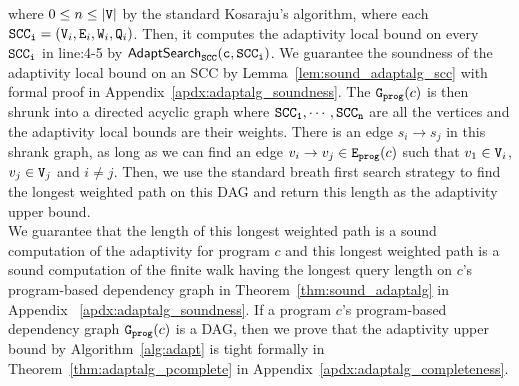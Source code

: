    where $0 \leq n \leq |\mathtt{V}|$ by the standard Kosaraju’s algorithm, where each
    $\mathtt{SCC_i} = (\mathtt{V}_i, \mathtt{E}_i, \mathtt{W}_i, \mathtt{Q}_i)$.
    Then, 
    it computes the adaptivity local bound on every $\mathtt{SCC_i}$
    in line:4-5 by $\mathtt{\mathsf{AdaptSearch}_{SCC}(c, SCC_i)}$.
    We guarantee the soundness of the adaptivity local bound on an SCC by Lemma~\ref{lem:sound_adaptalg_scc} with formal proof in Appendix~\ref{apdx:adaptalg_soundness}.
    The $\mathtt{{G_{prog}}}(c)$ is then shrunk into a directed acyclic graph where 
    $\mathtt{SCC_1}, \cdots, \mathtt{SCC_n}$ are all the vertices and the adaptivity local bounds are their weights.
    There is an edge $s_i \to s_j$ in this shrank graph, as long as we can find an edge $v_i \to v_j \in \mathtt{{E_{prog}}}(c)$ such that $v_1 \in \mathtt{V}_i$, $v_j \in \mathtt{V}_j$ and $i \neq j$.
    Then, we use the standard breath first search strategy to find the longest weighted path
    on this DAG and return this length as the adaptivity upper bound.
    \\
    We guarantee that 
    the length of this longest weighted path is a sound computation of the adaptivity for program $c$
    and this longest weighted path is a sound computation of the finite walk having the longest query length 
    on $c$'s program-based dependency graph in Theorem~\ref{thm:sound_adaptalg}
    in Appendix
    ~\ref{apdx:adaptalg_soundness}.
If a program
$c$'s program-based dependency graph $\mathtt{{G_{prog}}}(c)$ is a DAG, then we prove that the adaptivity upper bound by Algorithm~\ref{alg:adapt} is tight formally in Theorem~\ref{thm:adaptalg_pcomplete} in Appendix~\ref{apdx:adaptalg_completeness}.

